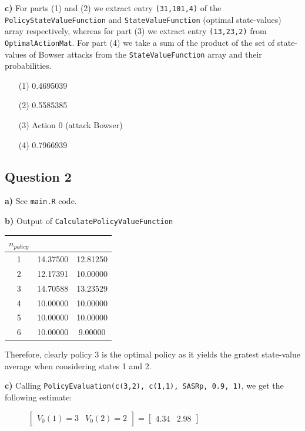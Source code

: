 \documentclass[a4paper,12pt]{article}
\def\code#1{\texttt{#1}}
\begin{document}
\textbf{c)} For parts (1) and (2) we extract entry \code{(31,101,4)} of the 
\code{PolicyStateValueFunction} and \code{StateValueFunction} (optimal state-values) array respectively, whereas for part (3) 
we extract entry \code{(13,23,2)} from \code{OptimalActionMat}. For part (4) we take a sum of the product of 
the set of state-values of Bowser attacks from the \code{StateValueFunction} array and their probabilities.

\begin{itemize}
  \item [(1)] 0.4695039
  \item [(2)] 0.5585385
  \item [(3)] Action 0 (attack Bowser)
  \item [(4)] 0.7966939
\end{itemize}

\subsection*{Question 2}

\textbf{a)} See \code{main.R} code.

\textbf{b)} Output of \code{CalculatePolicyValueFunction}

\begin{longtable}{|c|c|c|}
	\hline
	$n_{policy}$ & \text{State 1 Value} & \text{State 2 Value} \\ \hline
	1 & 14.37500 & 12.81250 \\ \hline
	2 & 12.17391 & 10.00000 \\ \hline
	3 & 14.70588 & 13.23529 \\ \hline
	4 & 10.00000 & 10.00000 \\ \hline
	5 & 10.00000 & 10.00000\\ \hline
	6 & 10.00000 & 9.00000 \\ \hline
\end{longtable}

Therefore, clearly policy 3 is the optimal policy as it yields the gratest state-value average when considering
states 1 and 2.

\textbf{c)} Calling \code{PolicyEvaluation(c(3,2), c(1,1), SASRp, 0.9, 1)}, we get the following estimate:

\begin{figure}[ht]
\centering
  $\begin{bmatrix}
    V_0(1) = 3 &  V_0(2) = 2 
  \end{bmatrix}
  =
  \begin{bmatrix}
    4.34 & 2.98
  \end{bmatrix}$       
\end{figure}
\end{document}
